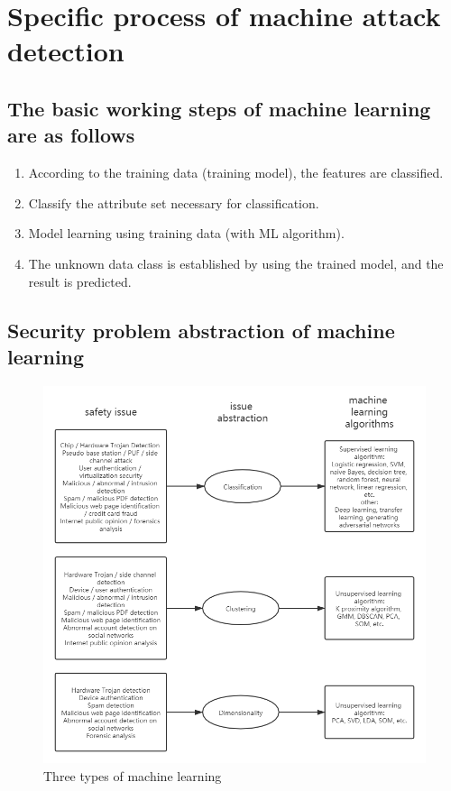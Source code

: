 \documentclass[UTF8]{article}
\begin{document}
\section{ Specific process of machine attack detection}

\subsection{The basic working steps of machine learning are as follows \cite{9}}

\begin{enumerate}

\item According to the training data (training model), the features are classified.

\item Classify the attribute set necessary for classification.

\item Model learning using training data (with ML algorithm).

\item The unknown data class is established by using the trained model, and the result is predicted.

\end{enumerate}

\subsection{Security problem abstraction of machine learning \cite{10}}

\begin{figure}[h]
\centering
\includegraphics[scale = 0.5]{6}
\caption{Three types of machine learning}
\end{figure}
\end{document}
